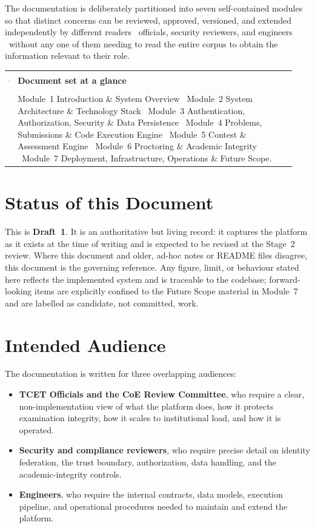 \documentclass[12pt,a4paper,oneside]{report}
\makeatletter
\newenvironment{callout}[1]{%
  \par\vspace{4pt}\noindent
  \begin{tabular}{@{}p{0.014\linewidth}@{\hspace{0.6em}}p{0.93\linewidth}@{}}
  \textcolor{boxframe}{\rule{2pt}{\baselineskip}} &
  \textbf{\textcolor{tcetblue}{#1}}\\[2pt]
  & }{\end{tabular}\par\vspace{6pt}}
\makeatother
\begin{document}
The documentation is deliberately partitioned into seven self-contained modules
so that distinct concerns can be reviewed, approved, versioned, and extended
independently by different readers \textemdash\ officials, security reviewers,
and engineers \textemdash\ without any one of them needing to read the entire
corpus to obtain the information relevant to their role.

\begin{callout}{Document set at a glance}
Module~1 Introduction \& System Overview \textbullet\ Module~2 System
Architecture \& Technology Stack \textbullet\ Module~3 Authentication,
Authorization, Security \& Data Persistence \textbullet\ Module~4 Problems,
Submissions \& Code Execution Engine \textbullet\ Module~5 Contest \& Assessment
Engine \textbullet\ Module~6 Proctoring \& Academic Integrity \textbullet\
Module~7 Deployment, Infrastructure, Operations \& Future Scope.
\end{callout}

\section{Status of this Document}
This is \textbf{Draft~1}. It is an authoritative but living record: it captures
the platform as it exists at the time of writing and is expected to be revised
at the Stage~2 review. Where this document and older, ad-hoc notes or README
files disagree, this document is the governing reference. Any figure, limit, or
behaviour stated here reflects the implemented system and is traceable to the
codebase; forward-looking items are explicitly confined to the Future Scope
material in Module~7 and are labelled as candidate, not committed, work.

\section{Intended Audience}
The documentation is written for three overlapping audiences:

\begin{itemize}[leftmargin=1.5em]
  \item \textbf{TCET Officials and the CoE Review Committee}, who require a clear,
        non-implementation view of what the platform does, how it protects
        examination integrity, how it scales to institutional load, and how it
        is operated.
  \item \textbf{Security and compliance reviewers}, who require precise detail on
        identity federation, the trust boundary, authorization, data handling,
        and the academic-integrity controls.
  \item \textbf{Engineers}, who require the internal contracts, data models,
        execution pipeline, and operational procedures needed to maintain and
        extend the platform.
\end{itemize}
\end{document}
